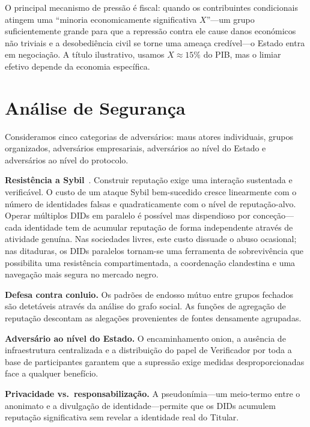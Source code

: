 \documentclass[11pt,a4paper,twocolumn]{article}
\begin{document}
O principal mecanismo de pressão é fiscal: quando os contribuintes condicionais atingem uma ``minoria economicamente significativa $X$''---um grupo suficientemente grande para que a repressão contra ele cause danos económicos não triviais e a desobediência civil se torne uma ameaça credível---o Estado entra em negociação. A título ilustrativo, usamos $X \approx 15\%$ do PIB, mas o limiar efetivo depende da economia específica.

\section{Análise de Segurança}

Consideramos cinco categorias de adversários: maus atores individuais, grupos organizados, adversários empresariais, adversários ao nível do Estado e adversários ao nível do protocolo.

\textbf{Resistência a Sybil}~\cite{douceur2002}. Construir reputação exige uma interação sustentada e verificável. O custo de um ataque Sybil bem-sucedido cresce linearmente com o número de identidades falsas e quadraticamente com o nível de reputação-alvo. Operar múltiplos DIDs em paralelo é possível mas dispendioso por conceção---cada identidade tem de acumular reputação de forma independente através de atividade genuína. Nas sociedades livres, este custo dissuade o abuso ocasional; nas ditaduras, os DIDs paralelos tornam-se uma ferramenta de sobrevivência que possibilita uma resistência compartimentada, a coordenação clandestina e uma navegação mais segura no mercado negro.

\textbf{Defesa contra conluio.} Os padrões de endosso mútuo entre grupos fechados são detetáveis através da análise do grafo social. As funções de agregação de reputação descontam as alegações provenientes de fontes densamente agrupadas.

\textbf{Adversário ao nível do Estado.} O encaminhamento onion, a ausência de infraestrutura centralizada e a distribuição do papel de Verificador por toda a base de participantes garantem que a supressão exige medidas desproporcionadas face a qualquer benefício.

\textbf{Privacidade vs.\ responsabilização.} A pseudonímia---um meio-termo entre o anonimato e a divulgação de identidade---permite que os DIDs acumulem reputação significativa sem revelar a identidade real do Titular.
\end{document}
